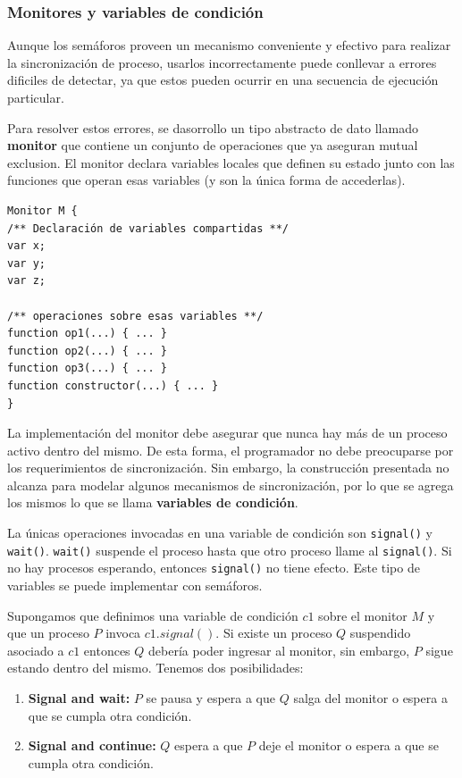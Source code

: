 \subsubsection{Monitores y variables de condición}
Aunque los semáforos proveen un mecanismo conveniente y efectivo para realizar la sincronización de proceso, usarlos incorrectamente puede conllevar a errores dificiles de detectar, ya que estos pueden ocurrir en una secuencia de ejecución particular.

Para resolver estos errores, se dasorrollo un tipo abstracto de dato llamado \textbf{monitor} que contiene un conjunto de operaciones que ya aseguran mutual exclusion. El monitor declara variables locales que definen su estado junto con las funciones que operan esas variables (y son la única forma de accederlas).

\begin{verbatim}
Monitor M {
/** Declaración de variables compartidas **/
var x;
var y;
var z;

/** operaciones sobre esas variables **/
function op1(...) { ... }
function op2(...) { ... }
function op3(...) { ... }
function constructor(...) { ... }
}
\end{verbatim}

La implementación del monitor debe asegurar que nunca hay más de un proceso activo dentro del mismo. De esta forma, el programador no debe preocuparse por los requerimientos de sincronización. Sin embargo, la construcción presentada no alcanza para modelar algunos mecanismos de sincronización, por lo que se agrega los mismos lo que se llama \textbf{variables de condición}.

La únicas operaciones invocadas en una variable de condición son \texttt{signal()} y \texttt{wait()}. \texttt{wait()} suspende el proceso hasta que otro proceso llame al \texttt{signal()}. Si no hay procesos esperando, entonces \texttt{signal()} no tiene efecto. Este tipo de variables se puede implementar con semáforos. 

Supongamos que definimos una variable de condición $c1$ sobre el monitor $M$ y que un proceso $P$ invoca $c1.signal()$. Si existe un proceso $Q$ suspendido asociado a $c1$ entonces $Q$ debería poder ingresar al monitor, sin embargo, $P$ sigue estando dentro del mismo. Tenemos dos posibilidades:

\begin{enumerate}
    \item \textbf{Signal and wait:} $P$ se pausa y espera a que $Q$ salga del monitor o espera a que se cumpla otra condición.
    \item \textbf{Signal and continue:} $Q$ espera a que $P$ deje el monitor o espera a que se cumpla otra condición.
\end{enumerate}

